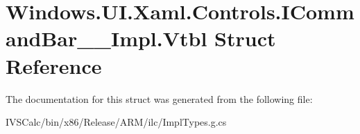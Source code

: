 \hypertarget{struct_windows_1_1_u_i_1_1_xaml_1_1_controls_1_1_i_command_bar_____impl_1_1_vtbl}{}\section{Windows.\+U\+I.\+Xaml.\+Controls.\+I\+Command\+Bar\+\_\+\+\_\+\+Impl.\+Vtbl Struct Reference}
\label{struct_windows_1_1_u_i_1_1_xaml_1_1_controls_1_1_i_command_bar_____impl_1_1_vtbl}


The documentation for this struct was generated from the following file\+:\begin{DoxyCompactItemize}
\item 
I\+V\+S\+Calc/bin/x86/\+Release/\+A\+R\+M/ilc/Impl\+Types.\+g.\+cs\end{DoxyCompactItemize}
